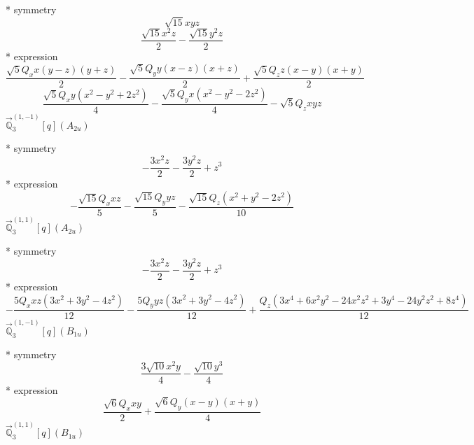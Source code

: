 \documentclass[fleqn,8pt]{jsarticle}
\begin{document}
\noindent\quad ** symmetry
\begin{dmath*}
\sqrt{15} x y z
\end{dmath*}
\begin{dmath*}
\frac{\sqrt{15} x^{2} z}{2} - \frac{\sqrt{15} y^{2} z}{2}
\end{dmath*}
\noindent\quad ** expression
\begin{dmath*}
\frac{\sqrt{5} Q_{x} x \left(y - z\right) \left(y + z\right)}{2} - \frac{\sqrt{5} Q_{y} y \left(x - z\right) \left(x + z\right)}{2} + \frac{\sqrt{5} Q_{z} z \left(x - y\right) \left(x + y\right)}{2}
\end{dmath*}
\begin{dmath*}
\frac{\sqrt{5} Q_{x} y \left(x^{2} - y^{2} + 2 z^{2}\right)}{4} - \frac{\sqrt{5} Q_{y} x \left(x^{2} - y^{2} - 2 z^{2}\right)}{4} - \sqrt{5} Q_{z} x y z
\end{dmath*}
\noindent\quad $\vec{\mathbb{Q}}_{3}^{(1,-1)}[q](A_{2u})$

\noindent\quad ** symmetry
\begin{dmath*}
- \frac{3 x^{2} z}{2} - \frac{3 y^{2} z}{2} + z^{3}
\end{dmath*}
\noindent\quad ** expression
\begin{dmath*}
- \frac{\sqrt{15} Q_{x} x z}{5} - \frac{\sqrt{15} Q_{y} y z}{5} - \frac{\sqrt{15} Q_{z} \left(x^{2} + y^{2} - 2 z^{2}\right)}{10}
\end{dmath*}
\noindent\quad $\vec{\mathbb{Q}}_{3}^{(1,1)}[q](A_{2u})$

\noindent\quad ** symmetry
\begin{dmath*}
- \frac{3 x^{2} z}{2} - \frac{3 y^{2} z}{2} + z^{3}
\end{dmath*}
\noindent\quad ** expression
\begin{dmath*}
- \frac{5 Q_{x} x z \left(3 x^{2} + 3 y^{2} - 4 z^{2}\right)}{12} - \frac{5 Q_{y} y z \left(3 x^{2} + 3 y^{2} - 4 z^{2}\right)}{12} + \frac{Q_{z} \left(3 x^{4} + 6 x^{2} y^{2} - 24 x^{2} z^{2} + 3 y^{4} - 24 y^{2} z^{2} + 8 z^{4}\right)}{12}
\end{dmath*}
\noindent\quad $\vec{\mathbb{Q}}_{3}^{(1,-1)}[q](B_{1u})$

\noindent\quad ** symmetry
\begin{dmath*}
\frac{3 \sqrt{10} x^{2} y}{4} - \frac{\sqrt{10} y^{3}}{4}
\end{dmath*}
\noindent\quad ** expression
\begin{dmath*}
\frac{\sqrt{6} Q_{x} x y}{2} + \frac{\sqrt{6} Q_{y} \left(x - y\right) \left(x + y\right)}{4}
\end{dmath*}
\noindent\quad $\vec{\mathbb{Q}}_{3}^{(1,1)}[q](B_{1u})$
\end{document}
